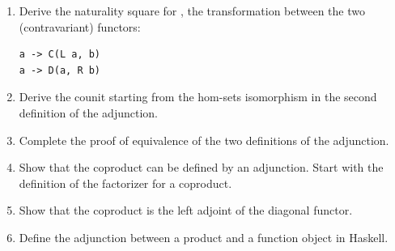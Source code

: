 \begin{enumerate}
\tightlist
\item
  Derive the naturality square for , the transformation
  between the two (contravariant) functors:

\begin{Verbatim}[commandchars=\\\{\}]
a -> C(L a, b)
a -> D(a, R b)
\end{Verbatim}
\item
  Derive the counit  starting from the hom-sets isomorphism in
  the second definition of the adjunction.
\item
  Complete the proof of equivalence of the two definitions of the
  adjunction.
\item
  Show that the coproduct can be defined by an adjunction. Start with
  the definition of the factorizer for a coproduct.
\item
  Show that the coproduct is the left adjoint of the diagonal functor.
\item
  Define the adjunction between a product and a function object in
  Haskell.
\end{enumerate}